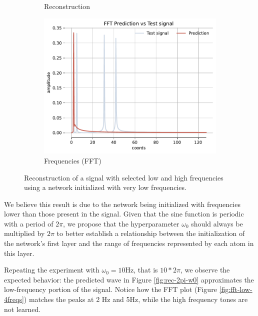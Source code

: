 \begin{figure}[h!]
\begin{subfigure}[b]{0.32\textwidth}
        \caption{Reconstruction}
        \label{fig:rec-naive-w0}
    \end{subfigure}
    \hfill
    \begin{subfigure}[b]{0.32\textwidth}
        \centering
        \includegraphics[width=\textwidth]{img/ch4/fft_w10_smoothed.pdf}
        \caption{Frequencies (FFT)}
        \label{fig:fft-smooth-4freqs}
    \end{subfigure}
    \label{f:4freqs-smoothed-reconstruction}
    \caption{Reconstruction of a signal with selected low and high frequencies using a network initialized with very low frequencies.}
\end{figure}


We believe this result is due to the network being initialized with frequencies lower than those present in the signal. Given that the sine function is periodic with a period of $2\pi$, we propose that the hyperparameter $\omega_0$ should always be multiplied by $2\pi$ to better establish a relationship between the initialization of the network's first layer and the range of frequencies represented by each atom in this layer.

Repeating the experiment with $\omega_0 = 10$Hz, that is $10*2\pi$, we observe the expected behavior: the predicted wave in Figure \ref{fig:rec-2pi-w0} approximates the low-frequency portion of the signal. Notice how the FFT plot (Figure \ref{fig:fft-low-4freqs}) matches the peaks at 2 Hz and 5Hz, while the high frequency tones are not learned.


